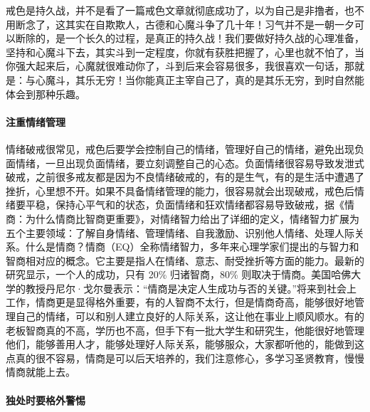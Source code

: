 戒色是持久战，并不是看了一篇戒色文章就彻底成功了，以为自己是非撸者，也不用断念了，这其实在自欺欺人，古德和心魔斗争了几十年！习气并不是一朝一夕可以断除的，是一个长久的过程，是真正的持久战！我们要做好持久战的心理准备，坚持和心魔斗下去，其实斗到一定程度，你就有获胜把握了，心里也就不怕了，当你强大起来后，心魔就很难动你了，斗到后来会容易很多，我很喜欢一句话，那就是：与心魔斗，其乐无穷！当你能真正主宰自己了，真的是其乐无穷，到时自然能体会到那种乐趣。

\paragraph{注重情绪管理}

情绪破戒很常见，戒色后要学会控制自己的情绪，管理好自己的情绪，避免出现负面情绪，一旦出现负面情绪，要立刻调整自己的心态。负面情绪很容易导致发泄式破戒，之前很多戒友都是因为不良情绪破戒的，有的是生气，有的是生活中遭遇了挫折，心里想不开。如果不具备情绪管理的能力，很容易就会出现破戒，戒色后情绪要平稳，保持心平气和的状态，负面情绪和狂欢情绪都容易导致破戒，据《情商：为什么情商比智商更重要》，对情绪智力给出了详细的定义，情绪智力扩展为五个主要领域：了解自身情绪、管理情绪、自我激励、识别他人情绪、处理人际关系。什么是情商？情商（EQ）全称情绪智力，多年来心理学家们提出的与智力和智商相对应的概念。它主要是指人在情绪、意志、耐受挫折等方面的能力。最新的研究显示，一个人的成功，只有 20\% 归诸智商，80\% 则取决于情商。美国哈佛大学的教授丹尼尔·戈尔曼表示：“情商是决定人生成功与否的关键。”将来到社会上工作，情商更是显得格外重要，有的人智商不太行，但是情商奇高，能够很好地管理自己的情绪，可以和别人建立良好的人际关系，这让他在事业上顺风顺水。有的老板智商真的不高，学历也不高，但手下有一批大学生和研究生，他能很好地管理他们，能够善用人才，能够处理好人际关系，能够服众，大家都听他的，能做到这点真的很不容易，情商是可以后天培养的，我们注意修心，多学习圣贤教育，慢慢情商就能上去。

\paragraph{独处时要格外警惕}

